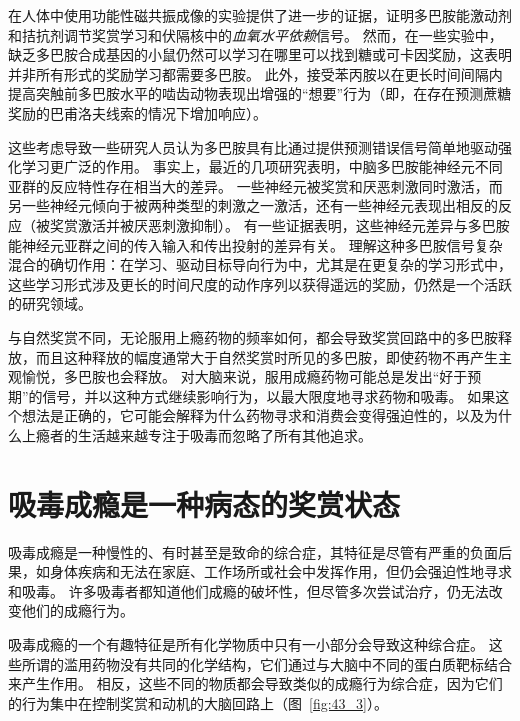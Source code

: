 在人体中使用功能性磁共振成像的实验提供了进一步的证据，证明多巴胺能激动剂和拮抗剂调节奖赏学习和伏隔核中的\textit{血氧水平依赖}信号。
然而，在一些实验中，缺乏多巴胺合成基因的小鼠仍然可以学习在哪里可以找到糖或可卡因奖励，这表明并非所有形式的奖励学习都需要多巴胺。
此外，接受苯丙胺以在更长时间间隔内提高突触前多巴胺水平的啮齿动物表现出增强的“想要”行为（即，在存在预测蔗糖奖励的巴甫洛夫线索的情况下增加响应）。


这些考虑导致一些研究人员认为多巴胺具有比通过提供预测错误信号简单地驱动强化学习更广泛的作用。
事实上，最近的几项研究表明，中脑多巴胺能神经元不同亚群的反应特性存在相当大的差异。
一些神经元被奖赏和厌恶刺激同时激活，而另一些神经元倾向于被两种类型的刺激之一激活，还有一些神经元表现出相反的反应（被奖赏激活并被厌恶刺激抑制）。
有一些证据表明，这些神经元差异与多巴胺能神经元亚群之间的传入输入和传出投射的差异有关。
理解这种多巴胺信号复杂混合的确切作用：在学习、驱动目标导向行为中，尤其是在更复杂的学习形式中，这些学习形式涉及更长的时间尺度的动作序列以获得遥远的奖励，仍然是一个活跃的研究领域。


与自然奖赏不同，无论服用上瘾药物的频率如何，都会导致奖赏回路中的多巴胺释放，而且这种释放的幅度通常大于自然奖赏时所见的多巴胺，即使药物不再产生主观愉悦，多巴胺也会释放。
对大脑来说，服用成瘾药物可能总是发出“好于预期”的信号，并以这种方式继续影响行为，以最大限度地寻求药物和吸毒。
如果这个想法是正确的，它可能会解释为什么药物寻求和消费会变得强迫性的，以及为什么上瘾者的生活越来越专注于吸毒而忽略了所有其他追求。



\section{吸毒成瘾是一种病态的奖赏状态}

吸毒成瘾是一种慢性的、有时甚至是致命的综合症，其特征是尽管有严重的负面后果，如身体疾病和无法在家庭、工作场所或社会中发挥作用，但仍会强迫性地寻求和吸毒。
许多吸毒者都知道他们成瘾的破坏性，但尽管多次尝试治疗，仍无法改变他们的成瘾行为。


吸毒成瘾的一个有趣特征是所有化学物质中只有一小部分会导致这种综合症。
这些所谓的滥用药物没有共同的化学结构，它们通过与大脑中不同的蛋白质靶标结合来产生作用。
相反，这些不同的物质都会导致类似的成瘾行为综合症，因为它们的行为集中在控制奖赏和动机的大脑回路上（图~\ref{fig:43_3}）。


